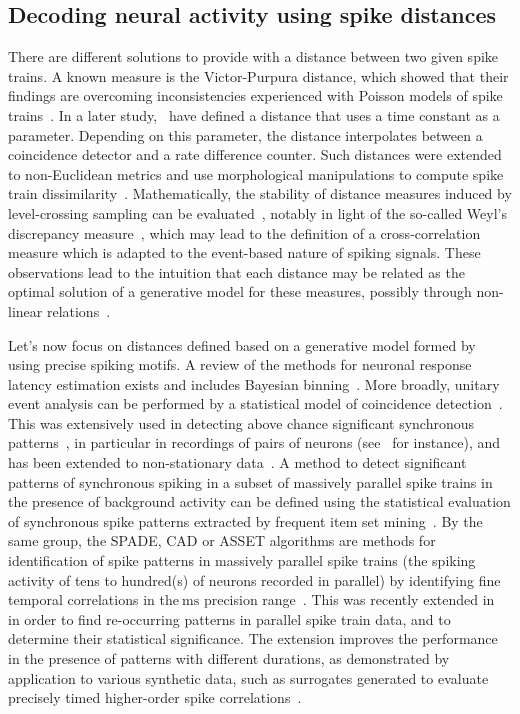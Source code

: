 \documentclass[brainsci, %
               review,submit,pdftex,moreauthors
               ]{Definitions/mdpi}
\newcommand{\ms}{\si{\milli\second}}%
\begin{document}
\subsection{Decoding neural activity using spike distances}\label{sec:detection}
There are different solutions to provide with a distance between two given spike trains. A known measure is the Victor-Purpura distance, which showed that their findings are overcoming inconsistencies experienced with Poisson models of spike trains~\citep{victor_nature_1996}. In a later study,~\citet{van_rossum_novel_2001} have defined a distance that uses a time constant as a parameter. Depending on this parameter, the distance interpolates between a coincidence detector and a rate difference counter. Such distances were extended to non-Euclidean metrics and use morphological manipulations to compute spike train dissimilarity~\citet{kreuz_measuring_2007}. Mathematically, the stability of distance measures induced by level-crossing sampling can be evaluated~\citep{moser_stability_2014}, notably in light of the so-called Weyl's discrepancy measure~\citep{weyl_ueber_1916}, which may lead to the definition of a cross-correlation measure which is adapted to the event-based nature of spiking signals. These observations lead to the intuition that each distance may be related as the optimal solution of a generative model for these measures, possibly through non-linear relations~\citep{aronov_non-euclidean_2004}. %

Let's now focus on distances defined based on a generative model formed by using precise spiking motifs. A review of the methods for neuronal response latency estimation exists and includes Bayesian binning~\citep{levakova_review_2015}. More broadly, unitary event analysis can be performed by a statistical model of coincidence detection~\citep{grun_unitary_2002-1}. This was extensively used in detecting above chance significant synchronous patterns~\citep{grun_unitary_2010}, in particular in recordings of pairs of neurons (see~\citep{riehle_spike_1997} for instance), and has been extended to non-stationary data~\citep{grun_unitary_2002}. A method to detect significant patterns of synchronous spiking in a subset of massively parallel spike trains in the presence of background activity can be defined using the statistical evaluation of synchronous spike patterns extracted by frequent item set mining~\citep{torre_statistical_2013}. By the same group, the SPADE, CAD or ASSET algorithms are methods for identification of spike patterns in massively parallel spike trains (the spiking activity of tens to hundred(s) of neurons recorded in parallel) by identifying fine temporal correlations in the$~\ms$ precision range~\citep{quaglio_methods_2018}. This was recently extended in~\citep{stella_3d-spade_2019} in order to find re-occurring patterns in parallel spike train data, and to determine their statistical significance. The extension improves the performance in the presence of patterns with different durations, as demonstrated by application to various synthetic data, such as surrogates generated to evaluate precisely timed higher-order spike correlations~\citep{stella_comparing_2022}.
\end{document}

